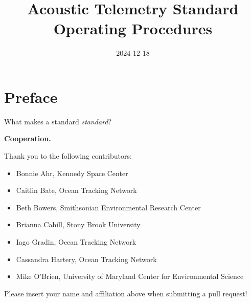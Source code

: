 \documentclass[
  letterpaper,
  DIV=11,
  numbers=noendperiod]{scrreprt}
\title{Acoustic Telemetry Standard Operating Procedures}
\author{}
\date{2024-12-18}
\providecommand{\tightlist}{%
  \setlength{\itemsep}{0pt}\setlength{\parskip}{0pt}}\usepackage{longtable,booktabs,array}
\renewcommand*\contentsname{Table of contents}
\newcommand\contentsname{Table of contents}
\begin{document}
\maketitle

\renewcommand*\contentsname{Table of contents}
{
\hypersetup{linkcolor=}
\setcounter{tocdepth}{2}
\tableofcontents
}


\chapter*{Preface}\label{preface}


What makes a standard \emph{standard}?

\textbf{Cooperation.}

Thank you to the following contributors:

\begin{itemize}
\tightlist
\item
  Bonnie Ahr, Kennedy Space Center
\item
  Caitlin Bate, Ocean Tracking Network
\item
  Beth Bowers, Smithsonian Environmental Research Center
\item
  Brianna Cahill, Stony Brook University
\item
  Iago Gradin, Ocean Tracking Network
\item
  Cassandra Hartery, Ocean Tracking Network
\item
  Mike O'Brien, University of Maryland Center for Environmental Science
\end{itemize}

\begin{tcolorbox}[enhanced jigsaw, title=\textcolor{quarto-callout-note-color}{\faInfo}\hspace{0.5em}{Note}, leftrule=.75mm, colback=white, colframe=quarto-callout-note-color-frame, opacityback=0, toptitle=1mm, titlerule=0mm, colbacktitle=quarto-callout-note-color!10!white, toprule=.15mm, left=2mm, bottomtitle=1mm, arc=.35mm, breakable, coltitle=black, rightrule=.15mm, bottomrule=.15mm, opacitybacktitle=0.6]

Please insert your name and affiliation above when submitting a pull
request!

\end{tcolorbox}

\end{document}
